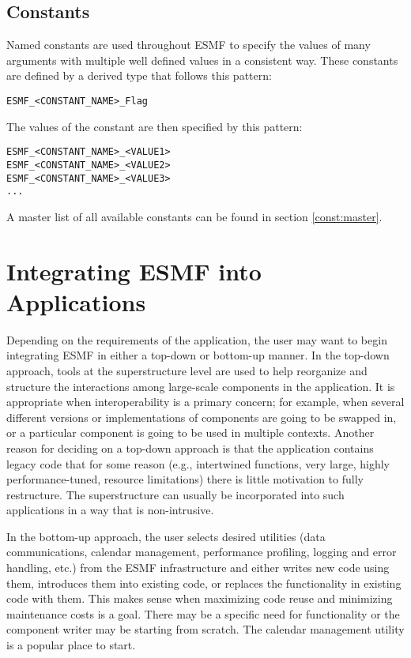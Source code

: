 \subsection{Constants}

Named constants are used throughout ESMF to specify the values of many 
arguments with multiple well defined values in a consistent way.  These 
constants are defined by a derived type that follows this pattern:

\begin{verbatim}
ESMF_<CONSTANT_NAME>_Flag
\end{verbatim}

The values of the constant are then specified by this pattern:

\begin{verbatim}
ESMF_<CONSTANT_NAME>_<VALUE1>
ESMF_<CONSTANT_NAME>_<VALUE2>
ESMF_<CONSTANT_NAME>_<VALUE3>
...
\end{verbatim}

A master list of all available constants can be found in section 
\ref{const:master}.


\section{Integrating ESMF into Applications}

Depending on the requirements of the application, the user may 
want to begin integrating ESMF in either a top-down or bottom-up 
manner.  In the top-down approach, tools at the superstructure 
level are used to help reorganize and structure the interactions
among large-scale components in the application.  It is appropriate
when interoperability is a primary concern; for example, when 
several different versions or implementations of components are going 
to be swapped in, or a particular component is going to be used 
in multiple contexts.  Another reason for deciding on a top-down 
approach is that the application contains legacy code that for 
some reason (e.g., intertwined functions, very large,
highly performance-tuned, resource limitations) there is little 
motivation to fully restructure.  The superstructure can usually be 
incorporated into such applications in a way that is non-intrusive.

In the bottom-up approach, the user selects desired utilities 
(data communications, calendar management, performance profiling,
logging and error handling, etc.) from the ESMF infrastructure 
and either writes new code using them, introduces them into 
existing code, or replaces the functionality in existing code 
with them.  This makes sense when maximizing code reuse and 
minimizing maintenance costs is a goal.  There may be a specific
need for functionality or the component writer may be starting
from scratch.  The calendar management utility is a popular
place to start.

